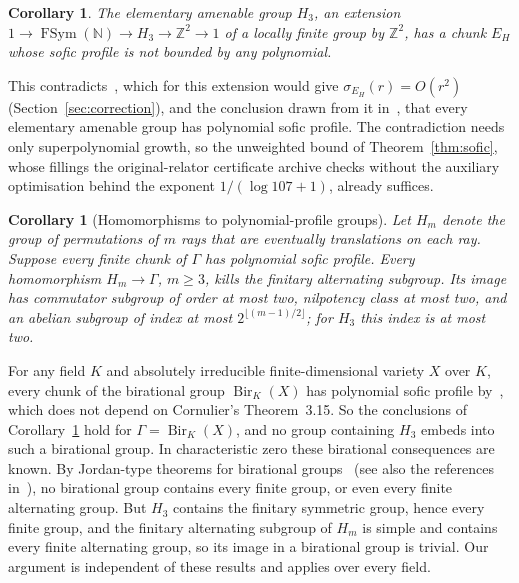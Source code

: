 \documentclass[11pt,a4paper]{article}
\theoremstyle{plain}
\newtheorem{corollary}[theorem]{Corollary}
\theoremstyle{definition}
\theoremstyle{remark}
\DeclareMathOperator{\FSym}{FSym}
\begin{document}
\begin{corollary}\label{cor:intro-cornulier}
The elementary amenable group $H_3$, an extension $1\to\FSym(\mathbb N)\to H_3\to\mathbb Z^2\to1$ of a locally finite group by
$\mathbb Z^2$, has a chunk $E_H$ whose sofic profile is not bounded by any polynomial.
\end{corollary}

This contradicts~\cite[Theorem~3.15]{Cornulier2013}, which for this extension would give $\sigma_{E_H}(r)=O(r^2)$
(Section~\ref{sec:correction}), and the conclusion drawn from it in~\cite[Example~3.16]{Cornulier2013}, that every elementary amenable
group has polynomial sofic profile. The contradiction needs only
superpolynomial growth, so the unweighted bound of Theorem~\ref{thm:sofic}, whose fillings the original-relator certificate archive
checks without the auxiliary optimisation behind the exponent $1/(\log107+1)$, already suffices.

\begin{corollary}[Homomorphisms to polynomial-profile groups]\label{cor:cremona}
Let $H_m$ denote the group of permutations of $m$ rays that are eventually translations on each ray.
Suppose every finite chunk of $\Gamma$ has polynomial sofic profile. Every homomorphism $H_m\to\Gamma$, $m\ge3$, kills the finitary
alternating subgroup. Its image has commutator subgroup of order at most two, nilpotency class at most two, and an abelian subgroup
of index at most $2^{\lfloor(m-1)/2\rfloor}$; for $H_3$ this index is at most two.
\end{corollary}

For any field $K$ and absolutely irreducible finite-dimensional variety $X$ over $K$, every chunk of the birational group
$\operatorname{Bir}_K(X)$ has polynomial sofic profile by~\cite[Corollary~4.5]{Cornulier2013}, which does not depend on Cornulier's
Theorem~3.15. So the conclusions of Corollary~\ref{cor:cremona} hold for $\Gamma=\operatorname{Bir}_K(X)$, and no group containing $H_3$
embeds into such a birational group. In characteristic zero these birational consequences are known. By Jordan-type theorems for
birational groups~\cite{ProkhorovShramov2016,Birkar2021,Guld2020} (see also the references in~\cite{DuncanHeathUrech2025}), no birational
group contains every finite group, or even every finite alternating group. But $H_3$ contains the finitary symmetric group, hence every
finite group, and the finitary alternating subgroup of $H_m$ is simple and contains every finite alternating group, so its image in a
birational group is trivial. Our argument is independent of these results and applies over every field.
\end{document}

